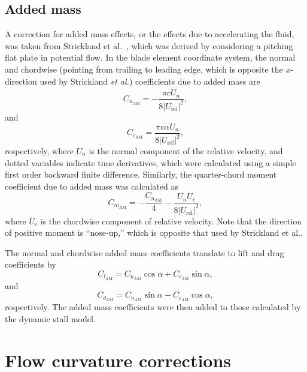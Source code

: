\subsection{Added mass}

A correction for added mass effects, or the effects due to accelerating the
fluid, was taken from Strickland et al.~\cite{Strickland1981}, which was
derived by considering a pitching flat plate in potential flow. In the blade
element coordinate system, the normal and chordwise (pointing from trailing to
leading edge, which is opposite the $x$-direction used by Strickland \emph{et
    al.}) coefficients due to added mass are
\begin{equation}
    C_{n_\mathrm{AM}} = -\frac{\pi c \dot{U_n}}{8 | U_\mathrm{rel} |^2}, 
\end{equation}
and
\begin{equation}
    C_{c_\mathrm{AM}} = \frac{\pi c \dot{\alpha} U_n }{8 | U_\mathrm{rel} |^2}, 
\end{equation}
respectively, where $U_n$ is the normal component of the relative velocity, and
dotted variables indicate time derivatives, which were calculated using a simple
first order backward finite difference. Similarly, the quarter-chord moment
coefficient due to added mass was calculated as
\begin{equation}
    C_{m_\mathrm{AM}} = -\frac{C_{n_\mathrm{AM}}}{4} 
        - \frac{U_n U_c}{8 | U_\mathrm{rel} |^2},
\end{equation}
where $U_c$ is the chordwise component of relative velocity. Note that the
direction of positive moment is ``nose-up,'' which is opposite that used by
Strickland et al..

The normal and chordwise added mass coefficients translate to lift and drag
coefficients by
\begin{equation}
    C_{l_\mathrm{AM}} = C_{n_\mathrm{AM}} \cos \alpha + C_{c_\mathrm{AM}} \sin
    \alpha,
\end{equation}
and
\begin{equation}
    C_{d_\mathrm{AM}} = C_{n_\mathrm{AM}} \sin \alpha - C_{c_\mathrm{AM}} \cos
    \alpha,
\end{equation}
respectively. The added mass coefficients were then added to those calculated by
the dynamic stall model.


\section{Flow curvature corrections}

